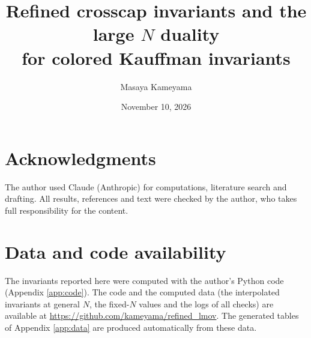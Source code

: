 \documentclass[11pt,a4paper]{article}
\title{Refined crosscap invariants and the large $N$ duality\\ for colored Kauffman invariants}
\author{Masaya Kameyama}
\date{November 10, 2026}
\numberwithin{equation}{section}
\theoremstyle{definition}
\theoremstyle{remark}
\begin{document}
\maketitle



\tableofcontents













\section*{Acknowledgments}
The author used Claude (Anthropic) for computations, literature search and drafting. All results, references and text were checked by the author, who takes full responsibility for the content.

\section*{Data and code availability}
The invariants reported here were computed with the author's Python code (Appendix \ref{app:code}). The code and the computed data (the interpolated invariants at general $N$, the fixed-$N$ values and the logs of all checks) are available at \url{https://github.com/kameyama/refined_lmov}. The generated tables of Appendix \ref{app:data} are produced automatically from these data.

\appendix





\printbibliography
\end{document}

